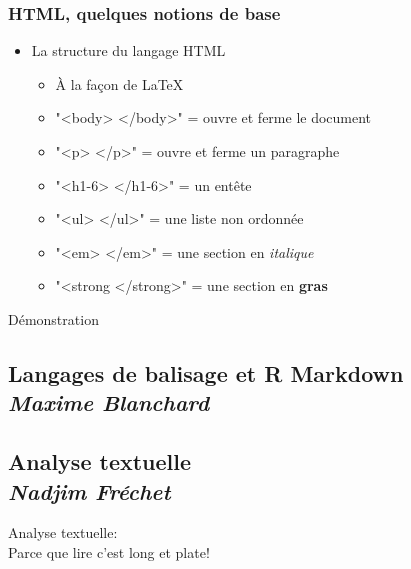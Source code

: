 \documentclass{beamer}
\begin{document}
      \begin{frame}
        \frametitle{HTML, quelques notions de base}
          \begin{itemize}
            \item<2-> La structure du langage HTML
              \begin{itemize}
                \item À la façon de \LaTeX
                \item "<body> </body>" = ouvre et ferme le document
                \item "<p> </p>" = ouvre et ferme un paragraphe
                \item "<h1-6> </h1-6>" = un entête
                \item "<ul> </ul>" =  une liste non ordonnée 
                \item "<em> </em>" = une section en \textit{italique}
                \item "<strong </strong>" = une section en \textbf{gras}
              \end{itemize}
            \end{itemize}
      \end{frame}
      
      \begin{frame}
     \begin{center}
          \Huge Démonstration
      \end{center}
\end{frame}

     
     
\subsection{Langages de balisage et R Markdown \\ \small\emph{Maxime Blanchard}}

     

\subsection{Analyse textuelle \\ \small\emph{Nadjim Fréchet}}


\begin{frame}
     \begin{center}
          \Huge Analyse textuelle: \\
       Parce que lire c'est long et plate!
      \end{center}
\end{frame}
\end{document}
